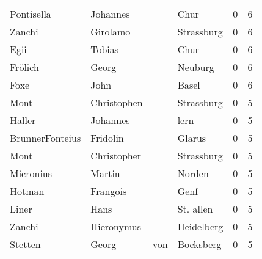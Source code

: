 \begin{tabular}{llllrr}
               Pontisella &                           Johannes &             &                                        Chur &          0 &         6 \\
                   Zanchi &                           Girolamo &             &                                  Strassburg &          0 &         6 \\
                     Egii &                             Tobias &             &                                        Chur &          0 &         6 \\
                  Frölich &                              Georg &             &                                     Neuburg &          0 &         6 \\
                     Foxe &                               John &             &                                       Basel &          0 &         6 \\
                     Mont &                        Christophen &             &                                  Strassburg &          0 &         5 \\
                   Haller &                           Johannes &             &                                        lern &          0 &         5 \\
          BrunnerFonteius &                           Fridolin &             &                                      Glarus &          0 &         5 \\
                     Mont &                        Christopher &             &                                  Strassburg &          0 &         5 \\
                Micronius &                             Martin &             &                                      Norden &          0 &         5 \\
                   Hotman &                           Frangois &             &                                        Genf &          0 &         5 \\
                    Liner &                               Hans &             &                                   St. allen &          0 &         5 \\
                   Zanchi &                         Hieronymus &             &                                  Heidelberg &          0 &         5 \\
                  Stetten &                              Georg &         von &                                   Bocksberg &          0 &         5 \\

\end{tabular}

